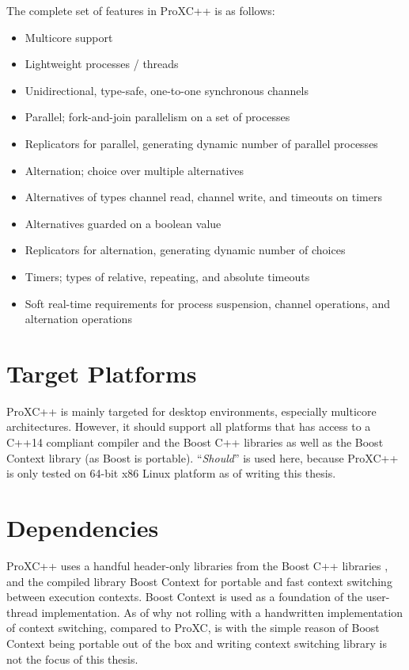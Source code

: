 The complete set of features in ProXC++ is as follows:

\begin{itemize}[topsep=0em,itemsep=-1em,partopsep=0.5em,parsep=1em]
    \item Multicore support
    \item Lightweight processes / threads
    \item Unidirectional, type\hyp{}safe, one\hyp{}to\hyp{}one synchronous channels
    \item Parallel; fork\hyp{}and\hyp{}join parallelism on a set of processes
    \item Replicators for parallel, generating dynamic number of parallel processes
    \item Alternation; choice over multiple alternatives
    \item Alternatives of types channel read, channel write, and timeouts on timers
    \item Alternatives guarded on a boolean value
    \item Replicators for alternation, generating dynamic number of choices
    \item Timers; types of relative, repeating, and absolute timeouts
    \item Soft real\hyp{}time requirements for process suspension, channel operations, and alternation operations
\end{itemize}


\section{Target Platforms}

ProXC++ is mainly targeted for desktop environments, especially multicore architectures. However, it should support all platforms that has access to a C++14 compliant compiler and the Boost C++ libraries \citep{boost2017boost} as well as the Boost Context library \citep{kowalke2017boost} (as Boost is portable). ``\textit{Should}'' is used here, because ProXC++ is only tested on 64\hyp{}bit x86 Linux platform as of writing this thesis.


\section{Dependencies}

ProXC++ uses a handful header\hyp{}only libraries from the Boost C++ libraries \citep{boost2017boost}, and the compiled library Boost Context \citep{kowalke2017boost} for portable and fast context switching between execution contexts. Boost Context is used as a foundation of the user\hyp{}thread implementation. As of why not rolling with a handwritten implementation of context switching, compared to ProXC, is with the simple reason of Boost Context being portable out of the box and writing context switching library is not the focus of this thesis.

